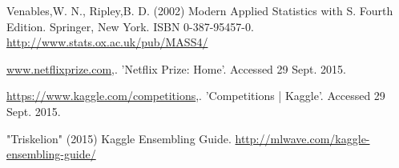 \documentclass{bioinfo}
\begin{document}
\begin{thebibliography}{9}
Venables,W. N., Ripley,B. D. (2002) Modern Applied Statistics with S. Fourth Edition. Springer, New York. ISBN 0-387-95457-0. \url{http://www.stats.ox.ac.uk/pub/MASS4/}

\url{www.netflixprize.com},. 'Netflix Prize: Home'. Accessed 29 Sept. 2015.

\url{https://www.kaggle.com/competitions},. 'Competitions | Kaggle'. Accessed 29 Sept. 2015.

"Triskelion" (2015) Kaggle Ensembling Guide. \url{http://mlwave.com/kaggle-ensembling-guide/}


\end{thebibliography}
\end{document}
